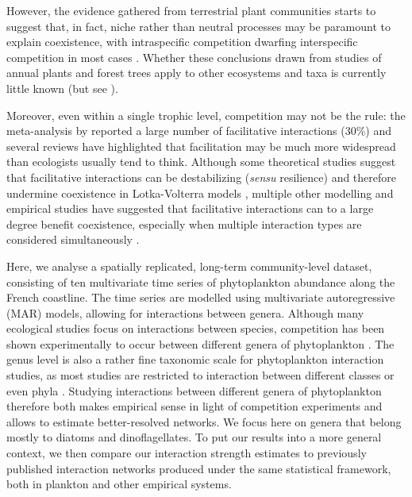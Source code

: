 \documentclass[10pt]{article}
\begin{document}
However, the evidence gathered from terrestrial plant communities
starts to suggest that, in fact, niche rather than neutral processes
may be paramount to explain coexistence, with intraspecific competition
dwarfing interspecific competition in most cases \citep{adler_coexistence_2010,adler_competition_2018}.
Whether these conclusions drawn from studies of annual plants and
forest trees apply to other ecosystems and taxa is currently little
known (but see \citealt{mutshinda_what_2009}).

Moreover, even within a single trophic level, competition may not
be the rule: the meta-analysis by \citet{adler_competition_2018}
reported a large number of facilitative interactions (30\%) and several
reviews \citep{brooker_facilitation_2008,mcintire2014facilitation}
have highlighted that facilitation may be much more widespread than
ecologists usually tend to think. Although some theoretical studies
suggest that facilitative interactions can be destabilizing (\emph{sensu}
resilience) and therefore undermine coexistence in Lotka-Volterra
models \citep{coyte_ecology_2015}, multiple other modelling \citep{gross_positive_2008}
and empirical \citep{brooker_facilitation_2008,cavieres2009facilitative}
studies have suggested that facilitative interactions can to a large
degree benefit coexistence, especially when multiple interaction types
are considered simultaneously \citep{mougi2012diversity,garcia2018effect}.

Here, we analyse a spatially replicated, long-term community-level
dataset, consisting of ten multivariate time series of phytoplankton
abundance along the French coastline. The time series are modelled
using multivariate autoregressive (MAR) models, allowing for interactions
between genera. Although many ecological studies focus on interactions
between species, competition has been shown experimentally to occur
between different genera of phytoplankton \citep{titman_ecological_1976,descamps-julien_stable_2005}.
The genus level is also a rather fine taxonomic scale for phytoplankton
interaction studies, as most studies are restricted to interaction
between different classes or even phyla \citep{ives_estimating_2003,hampton_sixty_2008,griffiths_phytoplankton_2015}.
Studying interactions between different genera of phytoplankton therefore
both makes empirical sense in light of competition experiments and
allows to estimate better-resolved networks. We focus here on genera
that belong mostly to diatoms and dinoflagellates. To put our results
into a more general context, we then compare our interaction strength
estimates to previously published interaction networks produced under
the same statistical framework, both in plankton and other empirical
systems.
\end{document}

